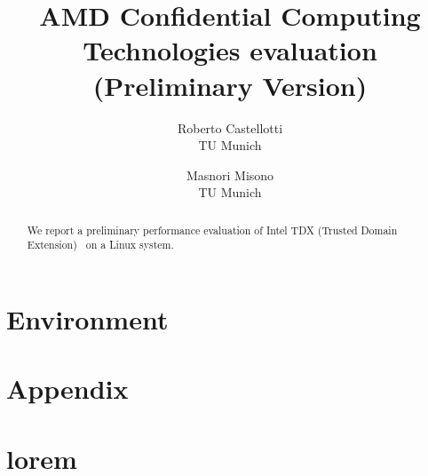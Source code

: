 \documentclass[letterpaper,twocolumn,10pt]{article}
\newcommand{\titlename}{
AMD Confidential Computing Technologies evaluation \\ (Preliminary Version)
}
\begin{document}
\date{}

\title{\Large \bf \titlename}

\author{{\rm Roberto Castellotti}\\TU Munich \and {\rm Masnori Misono}\\TU Munich}
\maketitle

\begin{abstract}
We report a preliminary performance evaluation of Intel TDX (Trusted Domain Extension)~\cite{tdx} on a Linux system.
\end{abstract}

\section{Environment}


\printbibliography

\appendix
\section*{Appendix}
\section{lorem}
\end{document}
